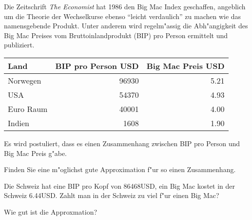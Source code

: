 Die Zeitschrift {\em The Economist} hat 1986 den Big Mac Index geschaffen,
angeblich um die Theorie der Wechselkurse ebenso ``leicht verdaulich''
zu machen wie das namensgebende Produkt.
Unter anderem wird regelm"assig die Abh"angigkeit des Big Mac Preises
vom Bruttoinlandprodukt (BIP) pro Person ermittelt und publiziert.
\begin{center}
\begin{tabular}{|l|r|r|}
\hline
Land&BIP pro Person USD&Big Mac Preis USD\\
\hline
Norwegen   &96930&5.21\\
USA        &54370&4.93\\
Euro Raum  &40001&4.00\\
Indien     & 1608&1.90\\
\hline
\end{tabular}
\end{center}
Es wird postuliert, dass es einen Zusammenhang zwischen 
BIP pro Person und Big Mac Preis g"abe.

\begin{teilaufgaben}
\item Finden Sie eine m"oglichst gute Approximation f"ur so einen Zusammenhang.
\item Die Schweiz hat eine BIP pro Kopf von 86468USD, ein Big Mac kostet
in der Schweiz 6.44USD.
Zahlt man in der Schweiz zu viel f"ur einen Big Mac?
\item Wie gut ist die Approxmation?
\end{teilaufgaben}

